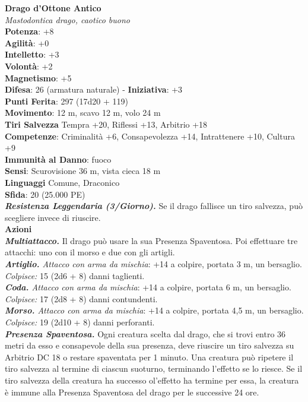 \begin{multicols}{2}
\medskip\textbf{Drago d'Ottone Antico}\\
\emph{Mastodontica drago, caotico buono}\\
\textbf{Potenza}: +8\\
\textbf{Agilità}: +0\\
\textbf{Intelletto}: +3\\
\textbf{Volontà}: +2\\
\textbf{Magnetismo}: +5\\
\textbf{Difesa}: 26 (armatura naturale) - \textbf{Iniziativa}: +3\\
\textbf{Punti Ferita}: 297 (17d20 + 119)\\
\textbf{Movimento}: 12 m, scavo 12 m, volo 24 m\\
\textbf{Tiri Salvezza} Tempra +20, Riflessi +13, Arbitrio +18\\
\textbf{Competenze}: Criminalità +6, Consapevolezza +14, Intrattenere +10, Cultura +9\\
\textbf{Immunità al Danno}: fuoco\\
\textbf{Sensi}: Scurovisione 36 m, vista cieca 18 m\\
\textbf{Linguaggi} Comune, Draconico\\
\textbf{Sfida}: 20 (25.000 PE)\smallskip\\
\emph{\textbf{Resistenza Leggendaria (3/Giorno).}} Se il drago fallisce un tiro salvezza, può scegliere invece di riuscire.\\
\smallskip\textbf{Azioni}\\
\emph{\textbf{Multiattacco.}} Il drago può usare la sua Presenza Spaventosa. Poi effettuare tre attacchi: uno con il morso e due con gli artigli.\\
\emph{\textbf{Artiglio.} Attacco con arma da mischia}: +14 a colpire, portata 3 m, un bersaglio.\\
\emph{Colpisce:} 15 (2d6 + 8) danni taglienti.\\
\emph{\textbf{Coda.} Attacco con arma da mischia}: +14 a colpire, portata 6 m, un bersaglio.\\
\emph{Colpisce:} 17 (2d8 + 8) danni contundenti.\\
\emph{\textbf{Morso.} Attacco con arma da mischia}: +14 a colpire, portata 4,5 m, un bersaglio.\\
\emph{Colpisce:} 19 (2d10 + 8) danni perforanti.\\
\emph{\textbf{Presenza Spaventosa.}} Ogni creatura scelta dal drago, che si trovi entro 36 metri da esso e consapevole della sua presenza, deve riuscire un tiro salvezza su Arbitrio DC 18 o restare spaventata per 1 minuto. Una creatura può ripetere il tiro salvezza al termine di ciascun suoturno,  terminando l'effetto se lo riesce. Se il tiro salvezza della creatura ha successo ol'effetto ha termine per essa, la creatura è  immune alla Presenza Spaventosa del drago per le successive 24 ore.\\

\end{multicols}
